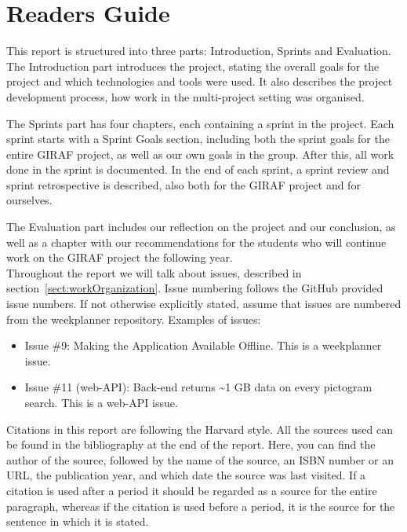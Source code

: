 \chapter*{Readers Guide}
This report is structured into three parts: Introduction, Sprints and Evaluation. 
The Introduction part introduces the project, stating the overall goals for the project and which technologies and tools were used.
It also describes the project development process, how work in the multi-project setting was organised.

The Sprints part has four chapters, each containing a sprint in the project. Each sprint starts with a Sprint Goals section, including both the sprint goals for the entire GIRAF project, as well as our own goals in the group. After this, all work done in the sprint is documented. In the end of each sprint, a sprint review and sprint retrospective is described, also both for the GIRAF project and for ourselves.

The Evaluation part includes our reflection on the project and our conclusion, as well as a chapter with our recommendations for the students who will continue work on the GIRAF project the following year.\\

Throughout the report we will talk about issues, described in section~\ref{sect:workOrganization}. Issue numbering follows the GitHub provided issue numbers. If not otherwise explicitly stated, assume that issues are numbered from the weekplanner repository.
Examples of issues:
\begin{itemize}
    \item Issue \#9: Making the Application Available Offline.
    \subitem This is a weekplanner issue.
    \item Issue \#11 (web-API): Back-end returns \textasciitilde 1 GB data on every pictogram search.
    \subitem This is a web-API issue.
\end{itemize}

Citations in this report are following the Harvard style. All the sources used can be found in the bibliography at the end of the report. Here, you can find the author of the source, followed by the name of the source, an ISBN number or an URL, the publication year, and which date the source was last visited.
If a citation is used after a period it should be regarded as a source for the entire paragraph, whereas if the citation is used before a period, it is the source for the sentence in which it is stated. 


